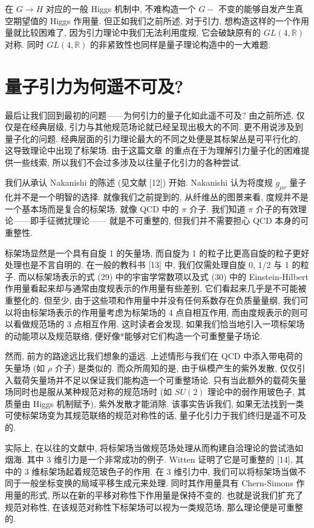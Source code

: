 \documentclass{article}
\begin{document}
在 $G\rightarrow H$ 对应的一般 Higgs 机制中, 不难构造一个 $G-$ 不变的能够自发产生真空期望值的 Higgs 作用量. 但正如我们之前所述, 对于引力, 想构造这样的一个作用量就比较困难了, 因为引力理论中我们无法利用度规, 它会破缺原有的  $GL(4, \mathbb{R})$ 对称. 同时  $GL(4, \mathbb{R})$ 的非紧致性也同样是量子理论构造中的一大难题.
\section{量子引力为何遥不可及?}
最后让我们回到最初的问题——为何引力的量子化如此遥不可及? 由之前所述, 仅仅是在经典层级, 引力与其他规范场论就已经呈现出极大的不同. 更不用说涉及到量子化的问题. 经典层面的引力理论最大的不同之处便是其标架丛是可平行化的, 这导致理论中出现了标架场. 由于这篇文章 的重点在于为理解引力量子化的困难提供一些线索, 所以我们不会过多涉及以往量子化引力的各种尝试.

我们从承认 Nakanishi 的陈述 (见文献 [12]) 开始. Nakanishi 认为将度规 $g_{\mu\nu}$ 量子化并不是一个明智的选择. 就像我们之前提到的, 从纤维丛的图景来看, 度规并不是一个基本场而是复合的标架场. 就像 QCD 中的 $\pi$ 介子. 我们知道 $\pi$ 介子的有效理论——即手征微扰理论——
就是不可重整的, 但我们并不需要担心 QCD 本身的可重整性.

标架场显然是一个具有自旋 1 的矢量场, 而自旋为 1 的粒子比更高自旋的粒子更好处理也是不言自明的. 在一般的教科书 [13] 中, 我们仅需处理自旋 0, 1/2 与 1 的粒子. 而以标架场表示的式 (29) 中的宇宙学常数项以及式 (30) 中的 Einstein-Hilbert 作用量看起来却与通常由度规表示的作用量有些差别, 它们看起来几乎是不可能被重整化的. 但至少, 由于这些项和作用量中并没有任何系数存在负质量量纲, 我们可以将由标架场表示的作用量考虑为标架场的 4 点自相互作用, 而由度规表示的则可以看做规范场的 3 点相互作用. 这时读者会发现, 如果我们恰当地引入一项标架场的动能项以及规范联络, 便好像*能够对它们构造一个可重整量子场论.

然而, 前方的路途远比我们想象的遥远. 上述情形与我们在 QCD 中添入带电荷的矢量场 (如 $\rho$ 介子) 是类似的. 而众所周知的是, 由于纵模产生的紫外发散, 仅仅引入载荷矢量场并不足以保证我们能构造一个可重整场论. 只有当此额外的载荷矢量场同时也是服从某种规范对称的规范场时 (如 $SU(2)$ 理论中的弱作用玻色子, 其质量由 Higgs 机制赋予), 紫外发散才能消除. 该事实告诉我们, 如果无法找到一类可使标架场变为其规范联络的规范对称性的话, 量子化引力于我们终归是遥不可及的.

实际上, 在以往的文献中, 将标架场当做规范场处理从而构建自洽理论的尝试浩如烟海. 其中 3 维引力是一个非常成功的例子. Witten 证明了它是可重整的 [14], 其中的 3 维标架场起着规范玻色子的作用. 在 3 维引力中, 我们可以将标架场当做不同于一般坐标变换的局域平移生成元来处理. 同时其作用量具有 Chern-Simons 作用量的形式, 所以在新的平移对称性下作用量是保持不变的. 也就是说我们扩充了规范对称性, 在该规范对称性下标架场可以视为一类规范场, 那么理论便是可重整的.
\end{document}

